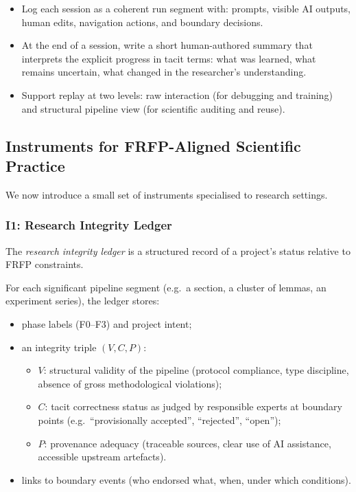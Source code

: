 \begin{itemize}
  \item Log each session as a coherent run segment with:
        prompts, visible AI outputs, human edits, navigation actions,
        and boundary decisions.
  \item At the end of a session, write a short human-authored summary that
        interprets the explicit progress in tacit terms:
        what was learned, what remains uncertain, what changed in the
        researcher's understanding.
  \item Support replay at two levels:
        raw interaction (for debugging and training) and
        structural pipeline view (for scientific auditing and reuse).
\end{itemize}

\subsection{Instruments for FRFP-Aligned Scientific Practice}
\label{sec:frfp-instruments-science}

We now introduce a small set of instruments specialised to research settings.

\subsubsection*{I1: Research Integrity Ledger}

The \emph{research integrity ledger} is a structured record of a project's
status relative to FRFP constraints.

For each significant pipeline segment (e.g.\ a section, a cluster of lemmas,
an experiment series), the ledger stores:

\begin{itemize}
  \item phase labels (F0--F3) and project intent;
  \item an integrity triple $(V, C, P)$:
        \begin{itemize}
          \item $V$: structural validity of the pipeline (protocol compliance,
                type discipline, absence of gross methodological violations);
          \item $C$: tacit correctness status as judged by responsible
                experts at boundary points (e.g.\ ``provisionally accepted'',
                ``rejected'', ``open'');
          \item $P$: provenance adequacy (traceable sources, clear use of
                AI assistance, accessible upstream artefacts).
        \end{itemize}
  \item links to boundary events (who endorsed what, when, under which
        conditions).
\end{itemize}

